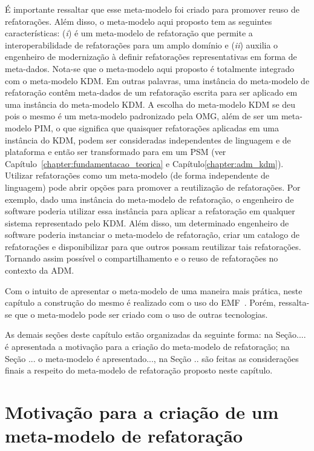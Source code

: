 É importante ressaltar que esse meta-modelo foi criado para promover reuso de refatorações. Além disso, o meta-modelo aqui proposto tem as seguintes características: (\textit{i}) é um meta-modelo de refatoração que permite a interoperabilidade de refatorações para um amplo domínio e (\textit{ii}) auxilia o engenheiro de modernização à definir refatorações representativas em forma de meta-dados. Nota-se que o meta-modelo aqui proposto é totalmente integrado com o meta-modelo KDM. Em outras palavras, uma instância do meta-modelo de refatoração contêm meta-dados de um refatoração escrita para ser aplicado em uma instância do meta-modelo KDM. A escolha do meta-modelo KDM se deu pois o mesmo é um meta-modelo padronizado pela OMG, além de ser um meta-modelo PIM, o que significa que quaisquer refatorações aplicadas em uma instância do KDM, podem ser consideradas independentes de linguagem e de plataforma e então ser transformado para em um PSM (ver Capítulo~\ref{chapter:fundamentacao_teorica} e Capítulo\ref{chapter:adm_kdm}). Utilizar refatorações como um meta-modelo (de forma independente de linguagem) pode abrir opções para promover a reutilização de refatorações. Por exemplo, dado uma instância do meta-modelo de refatoração, o engenheiro de software poderia utilizar essa instância para aplicar a refatoração em qualquer sistema representado pelo KDM. Além disso, um determinado engenheiro de software poderia instanciar o meta-modelo de refatoração, criar um catalogo de refatorações e disponibilizar para que outros possam reutilizar tais refatorações. Tornando assim possível o compartilhamento e o reuso de refatorações no contexto da ADM.

Com o intuito de apresentar o meta-modelo de uma maneira mais prática, neste capítulo a construção do mesmo é realizado com o uso do EMF~\cite{EMF}. Porém, ressalta-se que o meta-modelo pode ser criado com o uso de outras tecnologias.

As demais seções deste capítulo estão organizadas da seguinte forma: na Seção.... é apresentada a motivação para a criação do meta-modelo de refatoração; na Seção ... o meta-modelo é apresentado..., na Seção .. são feitas as considerações finais a respeito do meta-modelo de refatoração proposto neste capítulo.

\section{Motivação para a criação de um meta-modelo de refatoração} %
\label{sec:motiva_o_para_a_cria_o_de_um_meta_modelo_de_refatora_o}

